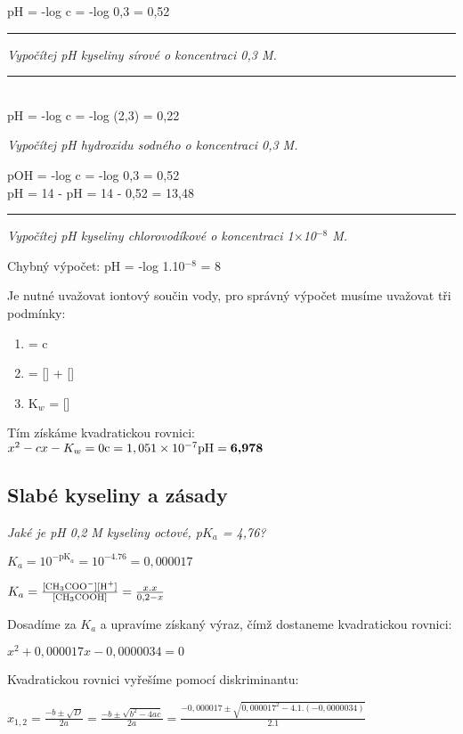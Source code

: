pH = -log c = -log 0,3 = 0,52\\
\hrule
\textit{Vypočítej pH kyseliny sírové o koncentraci 0,3 M.}
\hrule
{}\\
pH = -log c = -log (2,3) = 0,22

\textit{Vypočítej pH hydroxidu sodného o koncentraci 0,3 M.}


pOH = -log c = -log 0,3 = 0,52\\
pH = 14 - pH = 14 - 0,52 = 13,48
\hrule
\textit{Vypočítej pH kyseliny chlorovodíkové o koncentraci 1$\times$10$^{-8}$ M.}

Chybný výpočet: pH = -log 1.10$^{-8}$ = 8

Je nutné uvažovat iontový součin vody, pro správný výpočet musíme uvažovat tři podmínky:

\begin{enumerate}
	\item \ce{[Cl^-]} = c
	\item \ce{[H+]} = [] + []
	\item K$_w$ = \ce{[H+]}[]
\end{enumerate}

Tím získáme kvadratickou rovnici:\\
$x^2 - cx - K_w = 0\\
\textrm{c} = 1,051\times10^{-7}\\
\textrm{pH} = \textbf{6,978}$


\newpage

\subsection{Slabé kyseliny a zásady}
\emph{Jaké je pH 0,2 M kyseliny octové, p$K_a$ = 4,76?}


$K_a = 10^{-\textrm{pK}_a} = 10^{-4.76} = 0,000017$

$K_a = \frac{[\ce{CH3COO^-}][\ce{H^+}]}{[\ce{CH3COOH}]} = \frac{x.x}{0,2-x}$

Dosadíme za $K_a$ a upravíme získaný výraz, čímž dostaneme kvadratickou rovnici:

$x^2 + 0,000017x - 0,0000034 = 0$

Kvadratickou rovnici vyřešíme pomocí diskriminantu:

$x_{1,2} = \frac{-b \pm \sqrt{D}}{2a} = \frac{-b \pm \sqrt{b^2 - 4ac}}{2a} = \frac{-0,000017 \pm \sqrt{0,000017^2 - 4.1.(-0,0000034)}}{2.1}$

